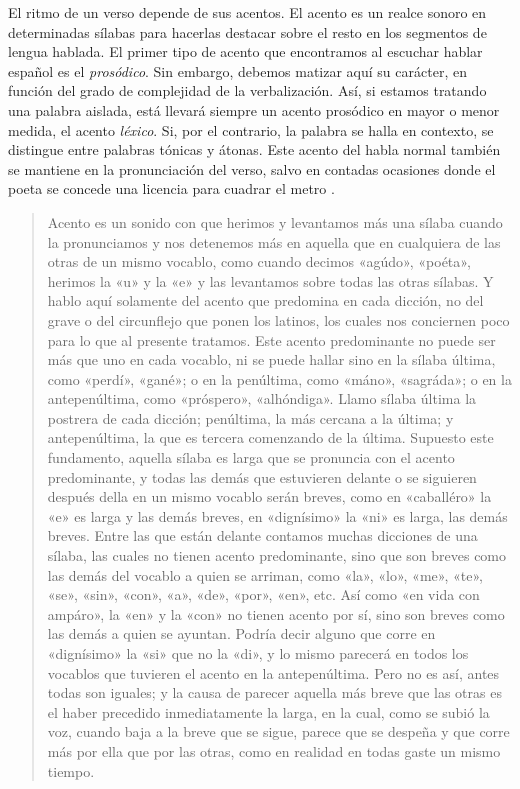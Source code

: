 El ritmo de un verso depende de sus acentos. El acento es un realce sonoro en determinadas sílabas para hacerlas destacar sobre el resto en los segmentos de lengua hablada. El primer tipo de acento que encontramos al escuchar hablar español es el \textit{prosódico}. Sin embargo, debemos matizar aquí su carácter, en función del grado de complejidad de la verbalización. Así, si estamos tratando una palabra aislada, está llevará siempre un acento prosódico en mayor o menor medida, el acento  \textit{léxico}. Si, por el contrario, la palabra se halla en contexto, se distingue entre palabras tónicas y átonas. Este acento del habla normal también se mantiene en la pronunciación del verso, salvo en contadas ocasiones donde el poeta se concede una licencia para cuadrar el metro \parencite[24]{baehr1997}.

\blockquote[{\cite[174-175]{diazrengifo2012}}]{Acento es un sonido con que herimos y levantamos más una sílaba cuando la pronunciamos y nos detenemos más en aquella que en cualquiera de las otras de un mismo vocablo, como cuando decimos «agúdo», «poéta», herimos la «u» y la «e» y las levantamos sobre todas las otras sílabas. Y hablo aquí solamente del acento que predomina en cada dicción, no del grave o del circunflejo que ponen los latinos, los cuales nos conciernen poco para lo que al presente tratamos. Este acento predominante no puede ser más que uno en cada vocablo, ni se puede hallar sino en la sílaba última, como «perdí», «gané»; o en la penúltima, como «máno», «sagráda»; o en la antepenúltima, como «próspero», «alhóndiga». Llamo sílaba última la postrera de cada dicción; penúltima, la más cercana a la última; y antepenúltima, la que es tercera comenzando de la última. Supuesto este fundamento, aquella sílaba es larga que se pronuncia con el acento predominante, y todas las demás que estuvieren delante o se siguieren después della en un mismo vocablo serán breves, como en «caballéro» la «e» es larga y las demás breves, en «dignísimo» la «ni» es larga, las demás breves. Entre las que están delante contamos muchas dicciones de una sílaba, las cuales no tienen acento predominante, sino que son breves como las demás del vocablo a quien se arriman, como «la», «lo», «me», «te», «se», «sin», «con», «a», «de», «por», «en», etc. Así como «en vida con ampáro», la «en» y la «con» no tienen acento por sí, sino son breves como las demás a quien se ayuntan. Podría decir alguno que corre en «dignísimo» la  «si» que no la «di», y lo mismo parecerá en todos los vocablos que tuvieren el acento en la antepenúltima. Pero no es así, antes todas son iguales; y la causa de parecer aquella más breve que las otras es el haber precedido inmediatamente la larga, en la cual, como se subió la voz, cuando baja a la breve que se sigue, parece que se despeña y que corre más por ella que por las otras, como en realidad en todas gaste un mismo tiempo.}

